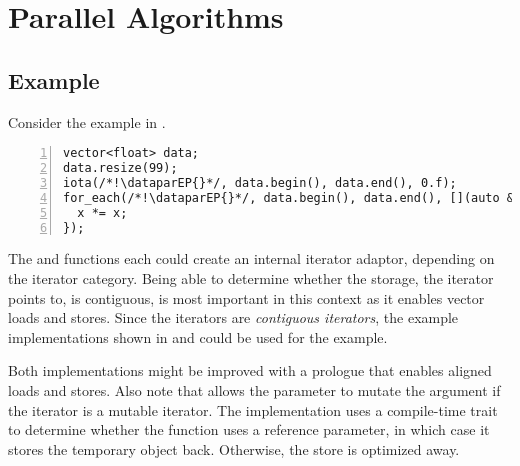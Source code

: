 \section{Parallel Algorithms}

\subsection{Example}
Consider the example in .
\begin{lstlisting}[style=Vc,numbers=left,float,label=lst:datapar foreach,caption={
  Example using \dataparEP with \code{iota} and \code{for_each}.
}]
vector<float> data;
data.resize(99);
iota(/*!\dataparEP{}*/, data.begin(), data.end(), 0.f);
for_each(/*!\dataparEP{}*/, data.begin(), data.end(), [](auto &x) {
  x *= x;
});
\end{lstlisting}
The  and  functions each could create an internal \datapar iterator adaptor, depending on the iterator category.
Being able to determine whether the storage, the iterator points to, is contiguous, is most important in this context as it enables vector loads and stores.
Since the \std{} iterators are \emph{contiguous iterators}, the example implementations shown in  and  could be used for the example.



Both implementations might be improved with a prologue that enables aligned loads and stores.
Also note that  allows the  parameter to mutate the argument if the iterator is a mutable iterator.
The implementation uses a compile-time trait to determine whether the function  uses a reference parameter, in which case it stores the temporary \datapar object back.
Otherwise, the store is optimized away.

